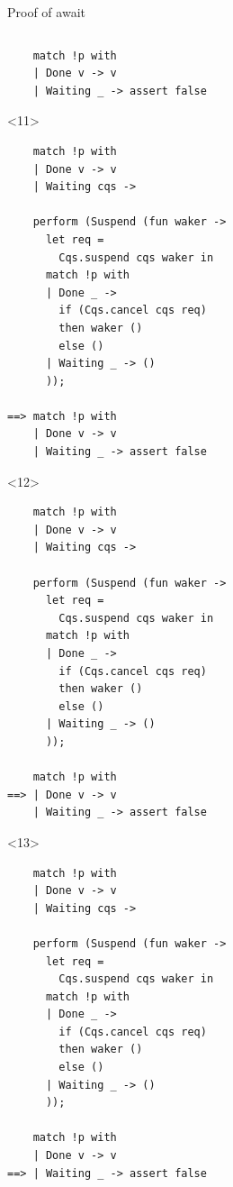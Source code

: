 \documentclass[aspectratio=43]{beamer}
\begin{document}
\begin{frame}[fragile,t]{Proof of await}
\begin{columns}
\begin{column}[T]{0.49\textwidth}
\begin{onlyenv}
\begin{verbatim}
    match !p with
    | Done v -> v
    | Waiting _ -> assert false
        \end{verbatim}
            \end{onlyenv}

            \begin{onlyenv}<11>
                \begin{verbatim}
    match !p with
    | Done v -> v
    | Waiting cqs ->
    
    perform (Suspend (fun waker ->
      let req = 
        Cqs.suspend cqs waker in
      match !p with
      | Done _ -> 
        if (Cqs.cancel cqs req)
        then waker ()
        else ()
      | Waiting _ -> ()
      ));
    
==> match !p with
    | Done v -> v
    | Waiting _ -> assert false
        \end{verbatim}
            \end{onlyenv}

            \begin{onlyenv}<12>
                \begin{verbatim}
    match !p with
    | Done v -> v
    | Waiting cqs ->
    
    perform (Suspend (fun waker ->
      let req = 
        Cqs.suspend cqs waker in
      match !p with
      | Done _ -> 
        if (Cqs.cancel cqs req)
        then waker ()
        else ()
      | Waiting _ -> ()
      ));
    
    match !p with
==> | Done v -> v
    | Waiting _ -> assert false
        \end{verbatim}
            \end{onlyenv}

            \begin{onlyenv}<13>
                \begin{verbatim}
    match !p with
    | Done v -> v
    | Waiting cqs ->
    
    perform (Suspend (fun waker ->
      let req = 
        Cqs.suspend cqs waker in
      match !p with
      | Done _ -> 
        if (Cqs.cancel cqs req)
        then waker ()
        else ()
      | Waiting _ -> ()
      ));
    
    match !p with
    | Done v -> v
==> | Waiting _ -> assert false
        \end{verbatim}
            \end{onlyenv}
        \end{column}
    \end{columns}
\end{frame}
\end{document}
